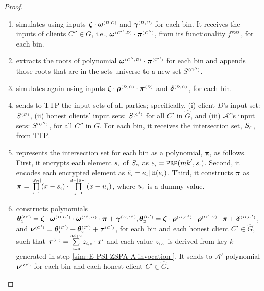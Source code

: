 \begin{proof}
\begin{enumerate}
\begin{enumerate}
\item\label{E-PSI::sim-A-first-VOPR-invocation} simulates \vopr using inputs ${\bm\zeta} \cdot {\bm\omega}^{ \scriptscriptstyle {  {(D,C)}}}$ and ${\bm\gamma}^{ \scriptscriptstyle {  {(D,C)}}}$ for each bin. It receives the inputs of clients $C''\in G$, i.e., ${\bm\omega}^{ \scriptscriptstyle {  {(C'',D)}}}\cdot {\bm\pi}^{ \scriptscriptstyle {  {(C'')}}}$, from its functionality $f^{\scriptscriptstyle \mathtt{VOPR}}$, for each bin.  
%
\item extracts the roots of polynomial ${\bm\omega}^{ \scriptscriptstyle {  {(C'',D)}}}\cdot {\bm\pi}^{ \scriptscriptstyle {  {(C'')}}}$ for each bin and appends those roots that are in the sets universe to a new set $S^{\scriptscriptstyle(C'')}$. 
%
\item simulates again \vopr using inputs ${\bm\zeta}\cdot {\bm \rho}^{ \scriptscriptstyle {  {(D,C)}}}\cdot {\bm\pi}^{ \scriptscriptstyle {  {(D)}}}$ and ${\bm\delta}^{ \scriptscriptstyle {  {(D,C)}}}$, for each bin.
%
\item sends to TTP the input sets of all parties; specifically, (i) client $D$'s input set: $S^{\scriptscriptstyle (D)}$, (ii) honest clients' input sets: $S^{\scriptscriptstyle (C')}$ for all $C'$ in $\hat G$, and (iii) $\mathcal{A}'$'s input sets: $S^{\scriptscriptstyle(C'')}$, for all $C''$ in $G$.  For each bin, it receives the intersection set, $S_{\scriptscriptstyle\cap}$, from TTP. 
%
\item represents the intersection set for each bin as a polynomial, ${\bm \pi}$, as follows. First, it encrypts each element $s_{\scriptscriptstyle i}$ of $S_{\scriptscriptstyle\cap}$ as $e_{\scriptscriptstyle i}=\mathtt{PRP}({mk}', s_{\scriptscriptstyle i})$. Second, it encodes each encrypted element as $\bar{e}_{\scriptscriptstyle i} =e_{\scriptscriptstyle i} || \mathtt{H}(e_{\scriptscriptstyle i})$. Third, it constructs ${\bm \pi}$ as ${\bm \pi}=\prod\limits^{\scriptscriptstyle |S_{\scriptscriptstyle\cap}|}_{\scriptscriptstyle i=1 }(x-s_{\scriptscriptstyle i})\cdot \prod\limits^{\scriptscriptstyle d-|S_{\scriptscriptstyle\cap}|}_{\scriptscriptstyle j=1 }(x-u_{\scriptscriptstyle j})$, where $u_{\scriptscriptstyle j}$ is a dummy value. 
%
\item constructs polynomials ${\bm\theta}^{ \scriptscriptstyle {  {(C')}}}_{\scriptscriptstyle 1}={\bm\zeta} \cdot {\bm\omega}^{ \scriptscriptstyle {  {(D,C')}}}\cdot {\bm\omega}^{ \scriptscriptstyle {  {(C',D)}}}\cdot {\bm\pi}+ {\bm\gamma}^{ \scriptscriptstyle {  {(D,C')}}}, {\bm\theta}^{ \scriptscriptstyle {  {(C')}}}_{\scriptscriptstyle 2}= {\bm\zeta} \cdot {\bm\rho}^{ \scriptscriptstyle {  {(D,C')}}}\cdot {\bm\rho}^{ \scriptscriptstyle {  {(C',D)}}}\cdot {\bm\pi}+ {\bm\delta}^{ \scriptscriptstyle {  {(D,C')}}}$, and $ {\bm\nu}^{ \scriptscriptstyle {  {(C')}} }=  {\bm\theta}^{ \scriptscriptstyle {  {(C')}}}_{\scriptscriptstyle 1}+ {\bm\theta}^{ \scriptscriptstyle {  {(C')}}}_{\scriptscriptstyle 2}+ {\bm \tau}^{ \scriptscriptstyle {  {(C')}} }$, for each bin and each honest client $C'\in\hat G$, such that $ {\bm\tau}^{ \scriptscriptstyle {  {(C)}}}=\sum\limits^{\scriptscriptstyle 3d+2}_{\scriptscriptstyle i=0}z_{\scriptscriptstyle i,c}\cdot x^{\scriptscriptstyle i}$ and each value $z_{\scriptscriptstyle i,c}$ is derived from key $ k$ generated in step \ref{sim::E-PSI-ZSPA-A-invocation-}.  It sends to $\mathcal{A}'$ polynomial  $ {\bm\nu}^{ \scriptscriptstyle {  {(C')}} }$ for each bin and each honest client $C'\in\hat G$. 

\end{enumerate}
\end{enumerate}
\end{proof}
